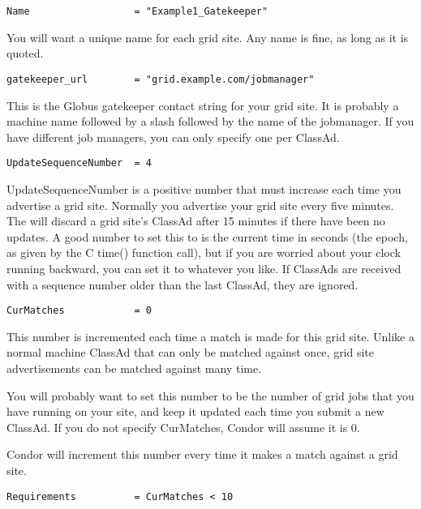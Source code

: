 \footnotesize
\begin{verbatim}
Name                  = "Example1_Gatekeeper"
\end{verbatim}
\normalsize

You will want a unique name for each grid site. Any name is fine, as long as
it is quoted.

\footnotesize
\begin{verbatim}
gatekeeper_url        = "grid.example.com/jobmanager"
\end{verbatim}
\normalsize

This is the Globus gatekeeper contact string for your grid site. It is
probably a machine name followed by a slash followed by the name of
the jobmanager. If you have different job managers, you can only
specify one per ClassAd. 

\begin{verbatim}
UpdateSequenceNumber  = 4
\end{verbatim}

UpdateSequenceNumber is a positive number that must increase each time
you advertise a grid site. Normally you advertise your grid site
every five minutes. The  will discard a grid site's
ClassAd after 15 minutes if there have been no updates. A good number
to set this to is the current time in seconds (the epoch, as given by
the C time() function call), but if you are worried about your clock
running backward, you can set it to whatever you like. If ClassAds are
received with a sequence number older than the last ClassAd, they are
ignored. 

\begin{verbatim}
CurMatches            = 0
\end{verbatim}

This number is incremented each time a match is made for this grid
site. Unlike a normal machine ClassAd that can only be matched against
once, grid site advertisements can be matched against many time. 

You will probably want to set this number to be the number of grid
jobs that you have running on your site, and keep it updated each time
you submit a new ClassAd. If you do not specify CurMatches, Condor
will assume it is 0.

Condor will increment this number every time it makes a match against
a grid site.

\footnotesize
\begin{verbatim}
Requirements          = CurMatches < 10
\end{verbatim}
\normalsize

